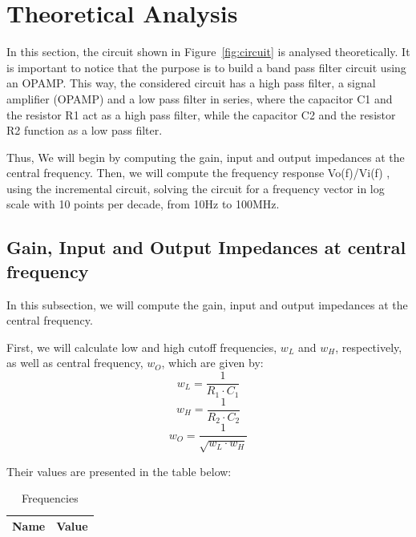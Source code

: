 \section{Theoretical Analysis}
\label{sec:analysis}
In this section, the circuit shown in Figure~\ref{fig:circuit} is analysed theoretically.
It is important to notice that the purpose is to build a band pass filter circuit using an OPAMP.
This way, the considered circuit has a high pass filter, a signal amplifier (OPAMP) and a low pass filter in series,
where the capacitor C1 and the resistor R1 act as a high pass filter, while the capacitor C2 and the resistor R2 function as a low pass filter.

Thus, We will begin by computing the gain, input and output impedances at the central frequency.
Then, we will compute the frequency response Vo(f)/Vi(f) , using the incremental circuit, 
solving the circuit for a frequency vector in log scale with 10 points per decade, from 10Hz to 100MHz.

\subsection{Gain, Input and Output Impedances at central frequency}
In this subsection, we will compute the gain, input and output impedances at the central frequency.

First, we will calculate low and high cutoff frequencies, $w_L$ and $ w_H$, respectively, as well as central frequency, $w_O$, which are given by:
\begin{equation}
	w_L=\frac{1}{R_{1} \cdot C_{1}}
\end{equation}
\begin{equation}
	w_H=\frac{1}{R_{2} \cdot C_{2}}
\end{equation}
\begin{equation}
	w_O=\frac{1}{ \sqrt{w_{L} \cdot w_{H}}}
\end{equation}

Their values are presented in the table below:
\begin{table}[H]
  \centering
  \begin{tabular}{|l|r|}
     \hline    
    {\bf Name} & {\bf Value} \\ \hline   
    
  \end{tabular}
  \caption{Frequencies}
  \label{tab:freq}
\end{table}

